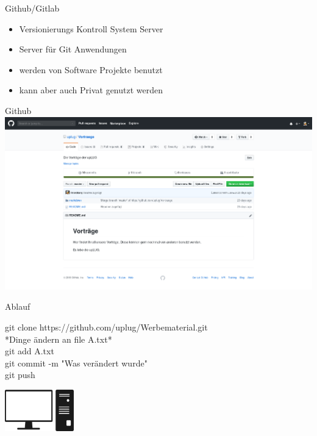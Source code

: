 \documentclass{beamer}
\begin{document}
\begin{frame}{Github/Gitlab}
    \begin{itemize}
         \item Versionierungs Kontroll System Server
         \item Server für Git Anwendungen
         \item werden von Software Projekte benutzt
         \item kann aber auch Privat genutzt werden
    \end{itemize}
\end{frame}

\begin{frame}{Github}
    \includegraphics[scale=0.20]{pictures/github.png}
\end{frame}{}

\begin{frame}{Ablauf}
    \begin{minipage}[b]{70mm}
 
 git clone https://github.com/uplug/Werbematerial.git \\
 \newline
 *Dinge ändern an file A.txt* \\
 \newline
 git add A.txt \\
 \newline
 git commit -m "Was verändert wurde"  \\
 \newline
 git push \\
    \end{minipage}
            \hfill      
    \begin{minipage}[b]{30mm}
        \includegraphics[width=30mm]{pictures/tower.png}
    \end{minipage}
\end{frame}
\end{document}
